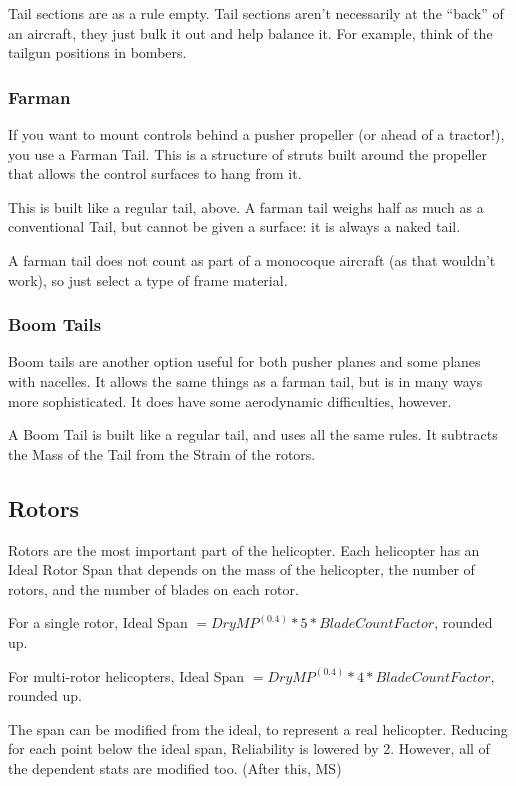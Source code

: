 \documentclass{article}
\begin{document}
Tail sections are as a rule empty. Tail sections aren't
necessarily at the ``back'' of an aircraft, they just bulk it out and
help balance it. For example, think of the tailgun positions in
bombers.

\subsubsection{Farman}
\label{_Farman}

If you want to mount controls behind a pusher propeller (or ahead of a
tractor!), you use a Farman Tail. This is a structure of struts built
around the propeller that allows the control surfaces to hang from it.

This is built like a regular tail, above. A farman tail weighs half as
much as a conventional Tail, but cannot be given a surface: it is always
a naked tail.

A farman tail does not count as part of a monocoque aircraft (as that
wouldn't work), so just select a type of frame material.

\subsubsection{Boom Tails}
\label{_Boom Tails}

Boom tails are another option useful for both pusher planes and some
planes with nacelles. It allows the same things as a farman tail, but is
in many ways more sophisticated. It does have some aerodynamic
difficulties, however.

A Boom Tail is built like a regular tail, and uses all the same rules.
It subtracts the Mass of the Tail from the Strain of the rotors.

\subsection{Rotors}
\label{_Rotors}

Rotors are the most important part of the helicopter.  Each helicopter has an Ideal Rotor Span that depends on the mass of the helicopter, the number of rotors, and the number of blades on each rotor.

For a single rotor, Ideal Span $= Dry MP^(0.4) * 5 * Blade Count Factor$, rounded up.

For multi-rotor helicopters, Ideal Span $= Dry MP^(0.4) * 4 * Blade Count Factor$, rounded up.

The span can be modified from the ideal, to represent a real helicopter.  Reducing for each point below the ideal span, Reliability is lowered by 2.  However, all of the dependent stats are modified too. (After this, MS)
\end{document}
